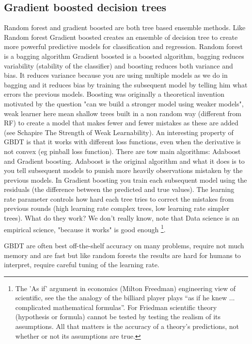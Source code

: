 \documentclass[12pt]{report}
\begin{document}
\subsection{Gradient boosted decision trees}
Random forest and gradient boosted are both tree based ensemble methods. Like Random forest Gradient boosted creates an ensemble of decision tree to create more powerful predictive models for classification and regression. Random forest is a bagging algorithm Gradient boosted is a boosted algorithm, bagging reduces variability (stability of the classifier) and boosting reduces both variance and bias. It reduces variance because you are using multiple models as we do in bagging and it reduces bias by training the subsequent model by telling him what errors the previous models.
Boosting was originally a theoretical invention motivated by the question "can we build a stronger model using weaker models", weak learner here mean shallow trees built in a non random way (different from RF) to create a model that makes fewer and fewer mistakes as these are added (see Schapire The Strength of Weak Learnability). An interesting property of GBDT is that it works with different loss functions, even when the derivative is not convex (eg pinball loss function). %
 There are tow main algorithms: Adaboost and Gradient boosting. Adaboost is the original algorithm and what it does is to you tell subsequent models to punish more heavily observations mistaken by the previous models. In Gradient boosting you train each subsequent model using the residuals (the difference between the predicted and true values). The learning rate parameter controls how hard each tree tries to correct the mistakes from previous rounds (high learning rate complex trees, low learning rate simpler trees). 
What do they work? We don't really know, note that Data science is an empirical science, "because it works" is good enough \footnote{The 'As if' argument in economics (Milton Freedman) engineering view of scientific, see the the analogy of the billiard player plays “as if he knew ... complicated mathematical formulas”. For Friedman scientific theory (hypothesis or formula) cannot be tested by testing the realism of its assumptions.  All that matters is the accuracy of a theory’s predictions, not whether or not its assumptions are true. }. %

GBDT are often best off-the-shelf accuracy on many problems, require not much memory and are fast but like random forests the results are hard for humans to interpret, require careful tuning of the learning rate.
\end{document}

